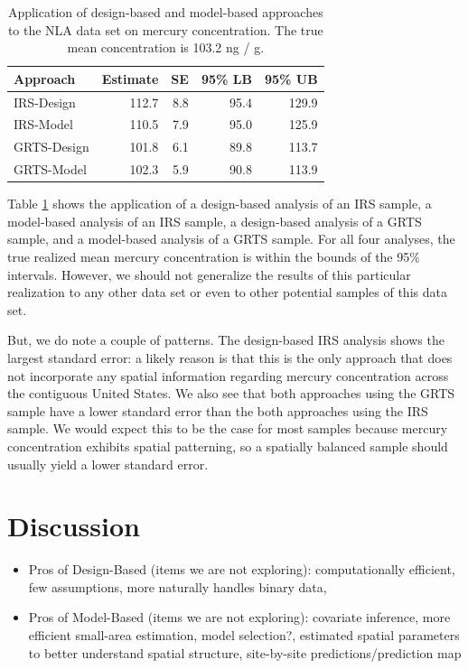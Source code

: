 \documentclass[]{elsarticle} %
\begin{document}
\begin{table}[ht]
\centering
\begin{tabular}{lrrrr}
  \hline
Approach & Estimate & SE & 95\% LB & 95\% UB \\ 
  \hline
IRS-Design & 112.7 & 8.8 & 95.4 & 129.9 \\ 
  IRS-Model & 110.5 & 7.9 & 95.0 & 125.9 \\ 
  GRTS-Design & 101.8 & 6.1 & 89.8 & 113.7 \\ 
  GRTS-Model & 102.3 & 5.9 & 90.8 & 113.9 \\ 
   \hline
\end{tabular}
\caption{\label{tab:appliedtab} Application of design-based and model-based approaches to the NLA data set on mercury concentration. The true mean concentration is 103.2 ng / g.} 
\end{table}

Table \ref{tab:appliedtab} shows the application of a design-based
analysis of an IRS sample, a model-based analysis of an IRS sample, a
design-based analysis of a GRTS sample, and a model-based analysis of a
GRTS sample. For all four analyses, the true realized mean mercury
concentration is within the bounds of the 95\% intervals. However, we
should not generalize the results of this particular realization to any
other data set or even to other potential samples of this data set.

But, we do note a couple of patterns. The design-based IRS analysis
shows the largest standard error: a likely reason is that this is the
only approach that does not incorporate any spatial information
regarding mercury concentration across the contiguous United States. We
also see that both approaches using the GRTS sample have a lower
standard error than the both approaches using the IRS sample. We would
expect this to be the case for most samples because mercury
concentration exhibits spatial patterning, so a spatially balanced
sample should usually yield a lower standard error.

\hypertarget{sec:discussion}{%
\section{Discussion}\label{sec:discussion}}

\begin{itemize}
\item
  Pros of Design-Based (items we are not exploring): computationally
  efficient, few assumptions, more naturally handles binary data,
\item
  Pros of Model-Based (items we are not exploring): covariate inference,
  more efficient small-area estimation, model selection?, estimated
  spatial parameters to better understand spatial structure,
  site-by-site predictions/prediction map
\end{itemize}
\end{document}
